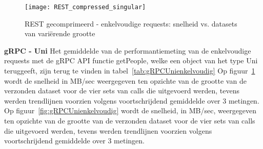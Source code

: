 \begin{figure}[ht]
    \centering
    \texttt{[image: REST\_compressed\_singular]}
    \caption{REST gecomprimeerd - enkelvoudige requests: snelheid vs. datasets van vari\"erende grootte}
    \label{fig:RESTcompressieenkelvoudig}
\end{figure}

\textbf{gRPC - Uni}\newline
Het gemiddelde van de performantiemeting van de enkelvoudige requests met de gRPC API functie getPeople, welke een object van het type Uni teruggeeft, zijn
terug te vinden in tabel~\ref{tab:gRPCUnienkelvoudig}
Op figuur~\ref{fig:RESTcompressieenkelvoudig} wordt de snelheid in MB/sec weergegeven ten opzichte van de grootte van de verzonden dataset voor de vier sets van
calls die uitgevoerd werden, tevens werden trendlijnen voorzien volgens voortschrijdend gemiddelde over 3 metingen.\\
Op figuur~\ref{fig:gRPCUnienkelvoudig} wordt de snelheid, in MB/sec, weergegeven ten opzichte van de grootte van de verzonden dataset voor de vier sets van
calls die uitgevoerd werden, tevens werden trendlijnen voorzien volgens voortschrijdend gemiddelde over 3 metingen.\\

